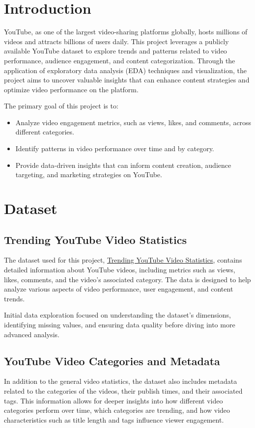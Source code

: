 \documentclass[a4paper]{article}
\begin{document}
 
\begin{multicols}{2}
\setlength{\columnsep}{0.5cm}


\section{Introduction}
YouTube, as one of the largest video-sharing platforms globally, hosts millions of videos and attracts billions of users daily. This project leverages a publicly available YouTube dataset to explore trends and patterns related to video performance, audience engagement, and content categorization. Through the application of exploratory data analysis (EDA) techniques and visualization, the project aims to uncover valuable insights that can enhance content strategies and optimize video performance on the platform.

The primary goal of this project is to: 
\begin{itemize} 
	\item Analyze video engagement metrics, such as views, likes, and comments, across different categories. 
	\item Identify patterns in video performance over time and by category. 
	\item Provide data-driven insights that can inform content creation, audience targeting, and marketing strategies on YouTube. 
\end{itemize}


\section{Dataset} 
\subsection{Trending YouTube Video Statistics} The dataset used for this project, 
\href{https://www.kaggle.com/datasets/datasnaek/youtube-new/}{Trending YouTube Video Statistics}, contains detailed information about YouTube videos, including metrics such as views, likes, comments, and the video’s associated category. The data is designed to help analyze various aspects of video performance, user engagement, and content trends.

Initial data exploration focused on understanding the dataset’s dimensions, identifying missing values, and ensuring data quality before diving into more advanced analysis.

\subsection{YouTube Video Categories and Metadata} In addition to the general video statistics, the dataset also includes metadata related to the categories of the videos, their publish times, and their associated tags. This information allows for deeper insights into how different video categories perform over time, which categories are trending, and how video characteristics such as title length and tags influence viewer engagement.


\end{multicols}
\end{document}
